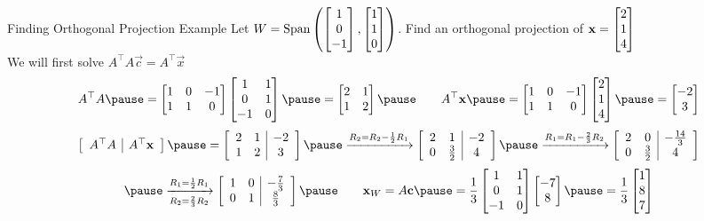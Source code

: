 \documentclass[xcoler=dvipsnames, aspectratio=169]{beamer}
\begin{document}
    \begin{frame}{Finding Orthogonal Projection Example}
        \small
        Let $W = \text{Span}\left(\begin{bmatrix}1\\0\\-1\end{bmatrix}, \begin{bmatrix}1\\1\\0\end{bmatrix}\right)$. Find an orthogonal projection of
        $\mathbf{x} = \begin{bmatrix}2\\1\\4\end{bmatrix}$\pause\\ We will first solve $A^\top A\vec{c} = A^\top\vec{x}$\pause
        \[
            A^\top A\pause = \bMat{
                1 & 0 & -1\\
                1 & 1 & 0
            }\bMat{
                1 & 1\\
                0 & 1\\
                -1& 0
            }\pause = \bMat{
                2 & 1\\
                1 & 2
            }\pause\qquad A^\top\vec{x}\pause = \bMat{
                1 & 0 & -1\\
                1 & 1 & 0
            }\bMat{2\\1\\4}\pause = \bMat{-2\\3}
        \]
        \[
            \aMat{c|c}{
                A^\top A & A^\top\vec{x}
            }\pause = \aMat{cc|c}{
                2 & 1 & -2\\
                1 & 2 & 3
            }\pause\xrightarrow{R_2=R_2-\frac{1}{2}R_1}\aMat{cc|c}{
                2 & 1 & -2\\
                0 & \frac{3}{2} & 4
            }\pause\xrightarrow{R_1=R_1-\frac{2}{3}R_2}\aMat{cc|c}{
                2 & 0 & -\frac{14}{3}\\
                0 & \frac{3}{2} & 4
            }
        \]
        \vspace{-5pt}
        \[
            \pause\xrightarrow[R_2=\frac{2}{3}R_2]{R_1=\frac{1}{2}R_1}\aMat{cc|c}{
                1 & 0 & -\frac{7}{3}\\
                0 & 1 & \frac{8}{3}
            }\pause\qquad \vec{x}_W = A\vec{c}\pause = \frac{1}{3}\bMat{
                1 & 1\\
                0 & 1\\
               -1 & 0
            }\bMat{-7\\8}\pause = \frac{1}{3}\bMat{
                1 \\ 8 \\ 7
            }
        \]
    \end{frame}
\end{document}
